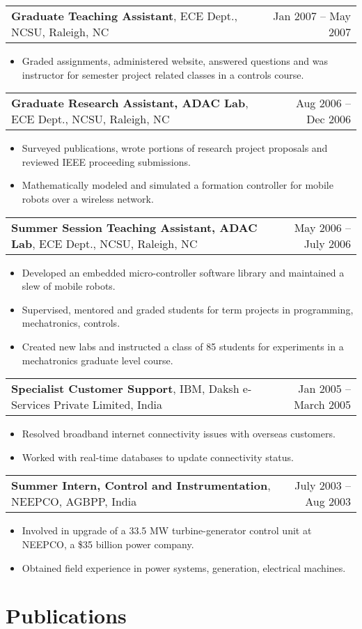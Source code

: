 \documentclass[letterpaper,10pt]{article}
\makeatletter
\newcommand{\experienceItem}[3]{
	\begin{tabular*}{\textwidth}{c@{\extracolsep{\fill}}c}
		\multicolumn{1}{l}{\textbf{#1}, #2} & \multicolumn{1}{r}{#3}\\
	\end{tabular*}\vspace{-10pt}
}
\newcommand{\resumeItemListStart}{\begin{itemize}}
\newcommand{\resumeItemListEnd}{\end{itemize}}
\newcommand{\resumeListItem}[1]{
	\item{#1 \vspace{-6pt}}
}
\makeatother
\begin{document}
	\experienceItem{Graduate Teaching Assistant}{ECE Dept., NCSU, Raleigh, NC}{Jan 2007 -- May 2007}
	\vspace{-8pt}
	\resumeItemListStart
	\resumeListItem {Graded assignments, administered website, answered questions and was instructor for semester project related classes in a controls course.}
	\resumeItemListEnd
	
	\experienceItem{Graduate Research Assistant, ADAC Lab}{ECE Dept., NCSU, Raleigh, NC}{Aug 2006 -- Dec 2006}
	\vspace{-8pt}
	\resumeItemListStart
	\resumeListItem {Surveyed publications, wrote portions of research project proposals and reviewed IEEE proceeding submissions.}
	\resumeListItem {Mathematically modeled and simulated a formation controller for mobile robots over a wireless network.}
	\resumeItemListEnd
	
	\experienceItem{Summer Session Teaching Assistant, ADAC Lab}{ECE Dept., NCSU, Raleigh, NC}{May 2006 -- July 2006}
	\vspace{-8pt}
	\resumeItemListStart
	\resumeListItem {Developed an embedded micro-controller software library and maintained a slew of mobile robots.}
	\resumeListItem {Supervised, mentored and graded students for term projects in programming, mechatronics, controls.}
	\resumeListItem {Created new labs and instructed a class of 85 students for experiments in a mechatronics graduate level course.}
	\resumeItemListEnd
	
	\experienceItem{Specialist Customer Support}{IBM, Daksh e-Services Private Limited, India}{Jan 2005 -- March 2005}
	\vspace{-8pt}
	\resumeItemListStart
	\resumeListItem {Resolved broadband internet connectivity issues with overseas customers.}
	\resumeListItem {Worked with real-time databases to update connectivity status.}
	\resumeItemListEnd
	
	\experienceItem{Summer Intern, Control and Instrumentation}{NEEPCO, AGBPP, India}{July 2003 -- Aug 2003}
	\vspace{-8pt}
	\resumeItemListStart
	\resumeListItem {Involved in upgrade of a 33.5 MW turbine-generator control unit at NEEPCO, a \$35 billion power company.}
	\resumeListItem {Obtained field experience in power systems, generation, electrical machines.}
	\resumeItemListEnd

	\section{Publications}
	
\end{document}
